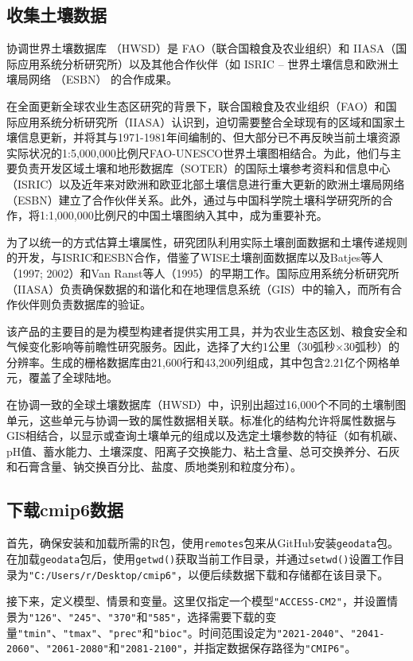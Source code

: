 \documentclass[AutoFakeBold]{LZUThesis-PgD&PhD}
\begin{document}
	\subsection{收集土壤数据}
	
	
	协调世界土壤数据库 （HWSD）是 FAO（联合国粮食及农业组织）和 IIASA（国际应用系统分析研究所）以及其他合作伙伴（如 ISRIC – 世界土壤信息和欧洲土壤局网络 （ESBN） 的合作成果。
	
	在全面更新全球农业生态区研究的背景下，联合国粮食及农业组织（FAO）和国际应用系统分析研究所（IIASA）认识到，迫切需要整合全球现有的区域和国家土壤信息更新，并将其与1971-1981年间编制的、但大部分已不再反映当前土壤资源实际状况的1:5,000,000比例尺FAO-UNESCO世界土壤图相结合。为此，他们与主要负责开发区域土壤和地形数据库（SOTER）的国际土壤参考资料和信息中心（ISRIC）以及近年来对欧洲和欧亚北部土壤信息进行重大更新的欧洲土壤局网络（ESBN）建立了合作伙伴关系。此外，通过与中国科学院土壤科学研究所的合作，将1:1,000,000比例尺的中国土壤图纳入其中，成为重要补充。
	
	为了以统一的方式估算土壤属性，研究团队利用实际土壤剖面数据和土壤传递规则的开发，与ISRIC和ESBN合作，借鉴了WISE土壤剖面数据库以及Batjes等人（1997; 2002）和Van Ranst等人（1995）的早期工作。国际应用系统分析研究所（IIASA）负责确保数据的和谐化和在地理信息系统（GIS）中的输入，而所有合作伙伴则负责数据库的验证。
	
	该产品的主要目的是为模型构建者提供实用工具，并为农业生态区划、粮食安全和气候变化影响等前瞻性研究服务。因此，选择了大约1公里（30弧秒×30弧秒）的分辨率。生成的栅格数据库由21,600行和43,200列组成，其中包含2.21亿个网格单元，覆盖了全球陆地。
	
	在协调一致的全球土壤数据库（HWSD）中，识别出超过16,000个不同的土壤制图单元，这些单元与协调一致的属性数据相关联。标准化的结构允许将属性数据与GIS相结合，以显示或查询土壤单元的组成以及选定土壤参数的特征（如有机碳、pH值、蓄水能力、土壤深度、阳离子交换能力、粘土含量、总可交换养分、石灰和石膏含量、钠交换百分比、盐度、质地类别和粒度分布）。
	
	\subsection{下载cmip6数据}
	首先，确保安装和加载所需的R包，使用\texttt{remotes}包来从GitHub安装\texttt{geodata}包。在加载\texttt{geodata}包后，使用\texttt{getwd()}获取当前工作目录，并通过\texttt{setwd()}设置工作目录为\texttt{"C:/Users/r/Desktop/cmip6"}，以便后续数据下载和存储都在该目录下。
	
	接下来，定义模型、情景和变量。这里仅指定一个模型\texttt{"ACCESS-CM2"}，并设置情景为\texttt{"126"}、\texttt{"245"}、\texttt{"370"}和\texttt{"585"}，选择需要下载的变量\texttt{"tmin"}、\texttt{"tmax"}、\texttt{"prec"}和\texttt{"bioc"}。时间范围设定为\texttt{"2021-2040"}、\texttt{"2041-2060"}、\texttt{"2061-2080"}和\texttt{"2081-2100"}，并指定数据保存路径为\texttt{"CMIP6"}。
	
\end{document}
